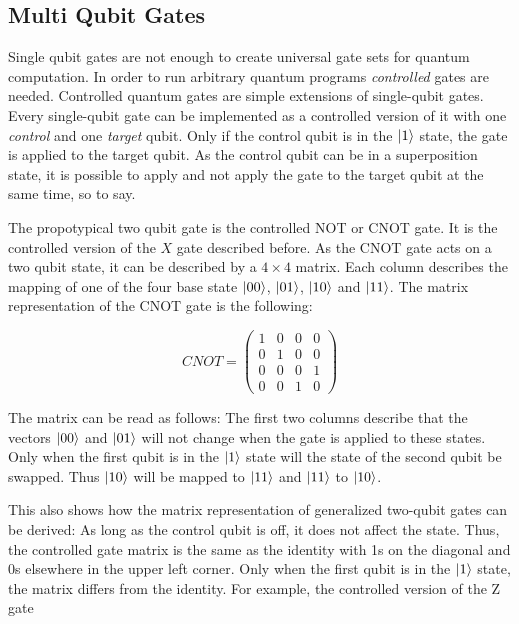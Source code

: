 \subsection{Multi Qubit Gates}

Single qubit gates are not enough to create universal gate sets for quantum
computation. In order to run arbitrary quantum programs 
 \textit{controlled} gates are needed.
Controlled quantum gates are simple extensions of single-qubit gates. Every single-qubit gate can be implemented as a controlled 
version of it with one \textit{control} and one \textit{target} qubit. Only if
the control qubit is in the $\Ket{1}$ state, the gate is applied to the target
qubit. As the control qubit can be in a superposition state, it is possible to apply and not apply the gate to the target qubit at the same time, so
to say.

The propotypical two qubit gate is the controlled NOT or CNOT gate. It is the controlled version of the 
$X$ gate described before. As the CNOT gate acts on a two qubit state, it can be described by 
a $4 \times 4$ matrix. Each column describes the mapping of one of the four base
state $\Ket{00}$, $\Ket{01}$, $\Ket{10}$ and $\Ket{11}$. 
The matrix representation of the CNOT gate is the following:

\begin{equation}
  CNOT = \begin{pmatrix}
    1 & 0 & 0 & 0 \\
    0 & 1 & 0 & 0 \\
    0 & 0 & 0 & 1 \\
    0 & 0 & 1 & 0
    \end{pmatrix}
\end{equation}

The matrix can be read as follows: The first two columns describe that the vectors $\Ket{00}$ and $\Ket{01}$ will not change when the gate is applied to these states. Only when the first qubit is in the $\Ket{1}$ state will the state of the second qubit be swapped. Thus $\Ket{10}$ will be mapped to $\Ket{11}$ and $\Ket{11}$ to $\Ket{10}$. 

This also shows how the matrix representation of generalized two-qubit gates can be derived: As long as the control qubit is off, it does not affect the state. Thus, the controlled gate matrix is the same as the identity with 1s on the diagonal and 0s elsewhere in the upper left corner. Only when the first qubit is in the $\Ket{1}$ state, the matrix differs from the identity. For example, the 
controlled version of the Z gate

